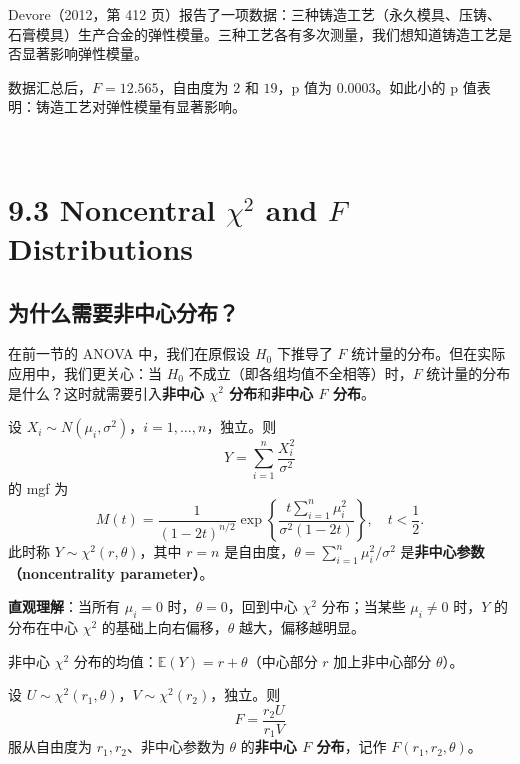 \begin{example}[合金弹性模量]\label{ex:elastic-modulus-anova}
Devore（2012，第 412 页）报告了一项数据：三种铸造工艺（永久模具、压铸、石膏模具）生产合金的弹性模量。三种工艺各有多次测量，我们想知道铸造工艺是否显著影响弹性模量。

数据汇总后，$F = 12.565$，自由度为 $2$ 和 $19$，p 值为 $0.0003$。如此小的 p 值表明：铸造工艺对弹性模量有显著影响。
\end{example}
\\

\section{9.3 Noncentral $\chi^2$ and $F$ Distributions}\label{sec:9.3}

\subsection{为什么需要非中心分布？}

在前一节的 ANOVA 中，我们在原假设 $H_0$ 下推导了 $F$ 统计量的分布。但在实际应用中，我们更关心：当 $H_0$ 不成立（即各组均值不全相等）时，$F$ 统计量的分布是什么？这时就需要引入\textbf{非中心 $\chi^2$ 分布}和\textbf{非中心 $F$ 分布}。

\begin{definition}\label{def:noncentral-chisq}
设 $X_i \sim N(\mu_i, \sigma^2)$，$i = 1, \ldots, n$，独立。则
\[
Y = \sum_{i=1}^n \frac{X_i^2}{\sigma^2}
\]
的 mgf 为
\[
M(t) = \frac{1}{(1-2t)^{n/2}} \exp\left\{\frac{t\sum_{i=1}^n \mu_i^2}{\sigma^2(1-2t)}\right\},\quad t < \frac{1}{2}.
\label{eq:noncentral-chisq-mgf}
\]
此时称 $Y \sim \chi^2(r, \theta)$，其中 $r = n$ 是自由度，$\theta = \sum_{i=1}^n \mu_i^2/\sigma^2$ 是\textbf{非中心参数（noncentrality parameter）}。
\end{definition}

\textbf{直观理解}：当所有 $\mu_i = 0$ 时，$\theta = 0$，回到中心 $\chi^2$ 分布；当某些 $\mu_i \neq 0$ 时，$Y$ 的分布在中心 $\chi^2$ 的基础上向右偏移，$\theta$ 越大，偏移越明显。

非中心 $\chi^2$ 分布的均值：$\mathbb{E}(Y) = r + \theta$（中心部分 $r$ 加上非中心部分 $\theta$）。

\begin{definition}[非中心 $F$ 分布]\label{def:noncentral-F}
设 $U \sim \chi^2(r_1, \theta)$，$V \sim \chi^2(r_2)$，独立。则
\[
F = \frac{r_2 U}{r_1 V}
\]
服从自由度为 $r_1, r_2$、非中心参数为 $\theta$ 的\textbf{非中心 $F$ 分布}，记作 $F(r_1, r_2, \theta)$。
\end{definition}

